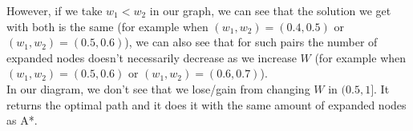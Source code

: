 \documentclass[12pt]{article}
\begin{document}
However, if we take $w_1<w_2$ in our graph, we can see that the solution we get with both is the same (for example when $(w_1,w_2)=(0.4,0.5)$ or $(w_1,w_2)=(0.5,0.6)$), we can also see that for such pairs the number of expanded nodes doesn't necessarily decrease as we increase $W$ (for example when $(w_1,w_2)=(0.5,0.6)$ or $(w_1,w_2)=(0.6,0.7)$).\\

In our diagram, we don't see that we lose/gain from changing $W$ in $(0.5,1]$. It returns the optimal path and it does it with the same amount of expanded nodes as A*.
\end{document}
